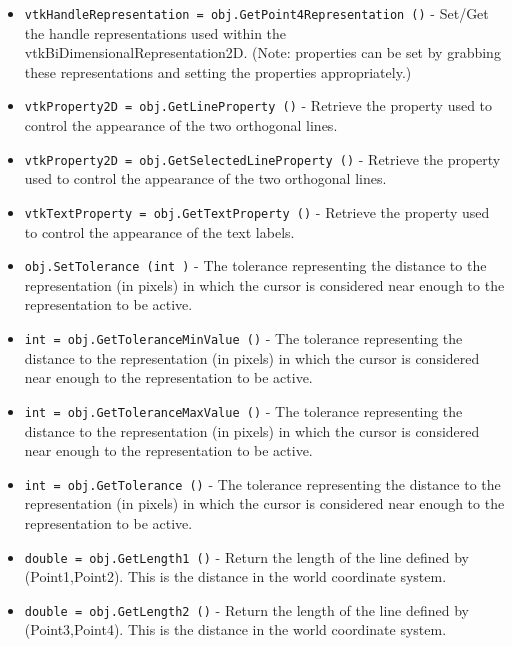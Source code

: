 \begin{itemize}
\item  \verb|vtkHandleRepresentation = obj.GetPoint4Representation ()| -  Set/Get the handle representations used within the
 vtkBiDimensionalRepresentation2D. (Note: properties can be set by
 grabbing these representations and setting the properties
 appropriately.)

\item  \verb|vtkProperty2D = obj.GetLineProperty ()| -  Retrieve the property used to control the appearance of the two
 orthogonal lines.

\item  \verb|vtkProperty2D = obj.GetSelectedLineProperty ()| -  Retrieve the property used to control the appearance of the two
 orthogonal lines.

\item  \verb|vtkTextProperty = obj.GetTextProperty ()| -  Retrieve the property used to control the appearance of the text
 labels.

\item  \verb|obj.SetTolerance (int )| -  The tolerance representing the distance to the representation (in
 pixels) in which the cursor is considered near enough to the
 representation to be active.

\item  \verb|int = obj.GetToleranceMinValue ()| -  The tolerance representing the distance to the representation (in
 pixels) in which the cursor is considered near enough to the
 representation to be active.

\item  \verb|int = obj.GetToleranceMaxValue ()| -  The tolerance representing the distance to the representation (in
 pixels) in which the cursor is considered near enough to the
 representation to be active.

\item  \verb|int = obj.GetTolerance ()| -  The tolerance representing the distance to the representation (in
 pixels) in which the cursor is considered near enough to the
 representation to be active.

\item  \verb|double = obj.GetLength1 ()| -  Return the length of the line defined by (Point1,Point2). This is the
 distance in the world coordinate system.

\item  \verb|double = obj.GetLength2 ()| -  Return the length of the line defined by (Point3,Point4). This is the
 distance in the world coordinate system.


\end{itemize}
